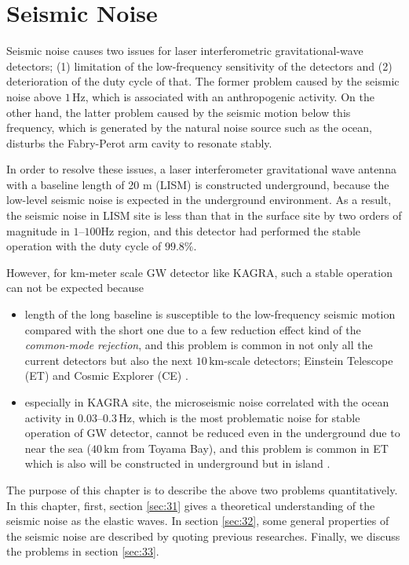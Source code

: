 \chapter{Seismic Noise} \label{chap2}
Seismic noise causes two issues for laser interferometric gravitational-wave detectors; (1) limitation of the low-frequency sensitivity of the detectors and (2) deterioration of the duty cycle of that. The former problem caused by the seismic noise above $1\,\mathrm{Hz}$, which is associated with an anthropogenic activity. On the other hand, the latter problem caused by the seismic motion below this frequency, which is generated by the natural noise source such as the ocean, disturbs the Fabry-Perot arm cavity to resonate stably.

In order to resolve these issues, a laser interferometer gravitational wave antenna with a baseline length of 20 m (LISM) \cite{sato2004ultrastable} is constructed underground, because the low-level seismic noise is expected in the underground environment. As a result, the seismic noise in LISM site is less than that in the surface site by two orders of magnitude in $1$--$100\mathrm{Hz}$ region, and this detector had performed the stable operation with the duty cycle of $99.8 \%$.

However, for km-meter scale GW detector like KAGRA, such a stable operation can not be expected because
\begin{itemize}
  \setlength{\itemsep}{1pt}      %
  \setlength{\parskip}{-1pt}     %
  \setlength{\itemindent}{0pt}   %
  \setlength{\labelsep}{5pt}     %
\item length of the long baseline is susceptible to the low-frequency seismic motion compared with the short one due to a few reduction effect kind of the {\it common-mode rejection}, and this problem is common in not only all the current detectors but also the next $10\,\mathrm{km}$-scale detectors; Einstein Telescope (ET)\cite{punturo2010einstein} and Cosmic Explorer (CE) \cite{abbott2017exploring}.
\item especially in KAGRA site, the microseismic noise correlated with the ocean activity in $0.03$--$0.3\,\mathrm{Hz}$, which is the most problematic noise for stable operation of GW detector, cannot be reduced even in the underground due to near the sea ($40\,\mathrm{km}$ from Toyama Bay), and this problem is common in ET which is also will be constructed in underground but in island \cite{naticchioni2014microseismic}.
\end{itemize}
The purpose of this chapter is to describe the above two problems quantitatively. In this chapter, first, section \cref{sec:31} gives a theoretical understanding of the seismic noise as the elastic waves. In section \cref{sec:32}, some general properties of the seismic noise are described by quoting previous researches. Finally, we discuss the problems in section \cref{sec:33}.




